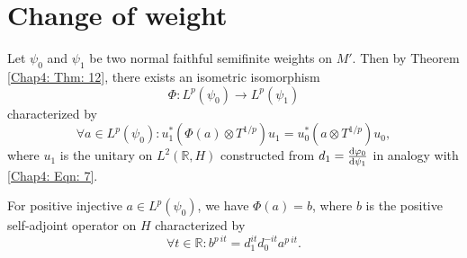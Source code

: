 \section{Change of weight}
Let $\psi_0$ and $\psi_1$ be two normal faithful semifinite weights on $M'$. Then by Theorem \ref{Chap4: Thm: 12}, there exists an isometric isomorphism
\begin{equation}
    \Phi:L^p(\psi_0)\to L^p(\psi_1)
\end{equation}
characterized by
\begin{equation}
    \forall a\in L^p(\psi_0):u_1^*(\Phi(a)\otimes T^{1/p})u_1=u_0^*(a\otimes T^{1/p})u_0,
\end{equation}
where $u_1$ is the unitary on $L^2(\mathbb{R},H)$ constructed from $d_1=\dv{\varphi_0}{\psi_1}$ in analogy with \eqref{Chap4: Eqn: 7}.\par
For positive injective $a\in L^p(\psi_0)$, we have $\Phi(a)=b$, where $b$ is the positive self-adjoint operator on $H$ characterized by
\begin{equation}
    \forall t\in \mathbb{R}: b^{p~it} = d_1^{it}d_0^{-it} a^{p~it}.
\end{equation}
% 
